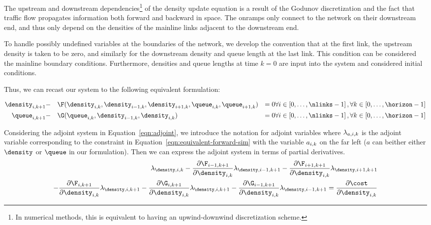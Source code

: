 \begin{remark}
The upstream and downstream dependencies\footnote{In numerical methods, this is equivalent to having an upwind-downwind discretization scheme.} of the density update equation is a result of the Godunov discretization and the fact that traffic flow propagates information both forward and backward in space. The onramps only connect to the network on their downstream end, and thus only depend on the densities of the mainline links adjacent to the downstream end.
\end{remark}

\begin{remark}
To handle possibly undefined variables at the boundaries of the network, we develop the convention that at the first link, the upstream density is taken to be zero, and similarly for the downstream density and queue length at the last link. This condition can be considered the mainline boundary conditions. Furthermore, densities and queue lengths at time $k=0$ are input into the system and considered initial conditions.
\end{remark}

Thus, we can recast our system to the following equivalent formulation:

\begin{equation}
\label{eqn:equivalent-forward-sim}
\begin{aligned}
\idx{\density}{i}{k+1} &-&& \F(\idx{\density}{i}{k}, 
        \idx{\density}{i-1}{k}, 
        \idx{\density}{i+1}{k}, 
        \idx{\queue}{i}{k}, 
        \idx{\queue}{i+1}{k}) &=0 & 
        \forall i\in\left[0,\ldots,\nlinks-1\right] ,
        \forall k\in\left[0,\ldots,\horizon-1\right] \\
\idx{\queue}{i}{k+1} &-&& \G(\idx{\queue}{i}{k}, 
        \idx{\density}{i-1}{k}, 
        \idx{\density}{i}{k}) &=0& 
        \forall i\in\left[0,\ldots,\nlinks-1\right] ,
        \forall k\in\left[0,\ldots,\horizon-1\right]
\end{aligned}
\end{equation}

Considering the adjoint system in Equation~\eqref{eqn:adjoint}, we introduce the notation for adjoint variables where $\lambda_{a,i,k}$ is the adjoint variable corresponding to the constraint in Equation~\eqref{eqn:equivalent-forward-sim} with the variable $a_{i,k}$ on the far left ($a$ can beither either $\density$ or $\queue$ in our formulation). Then we can express the adjoint system in terms of partial derivatives.
\begin{equation}
\label{eqn:adj-density}
\begin{aligned}
\adj{\density}{i}{k} - \fFik{i-1}{k+1} - \fFik{i+1}{k+1} \\
- \fFik{i}{k+1} - \fGik{i}{k+1} - \fGik{i-1}{k+1} = \pFrac{\cost}{\idx{\density}{i}{k}}
\end{aligned}
\end{equation}

